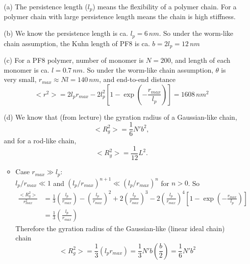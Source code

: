 \documentclass[a4paper]{article}
\begin{document}
\begin{enumerate}
    \item[(a)] The persistence length ($l_p$) means the flexibility of a polymer chain. For a polymer chain with large persistence length means the chain is high stiffness.
    
    \item[(b)] We know the persistence length is ca. $l_p=6\,nm$. So under the worm-like chain assumption, the Kuhn length of PF8  is ca. $b=2l_p=12\,nm$
    
    \item[(c)] For a PF8 polymer, number of monomer is $N=200$, and length of each monomer is ca. $l=0.7\,nm$. So under the worm-like chain assumption, $\theta$ is very small, $r_{max} \approx  Nl = 140\,nm$, and end-to-end distance 
    \[
    <r^2> = 2 l_p r_{max} - 2 l_p^2 \left[ 1- \exp \left(-\frac{r_{max}}{l_p} \right)\right] 
    = 1608\, nm^2
    \]
    \item[(d)] We know that (from lecture) the gyration radius of a Gaussian-like chain, 
    \[
    <R_g^2> = \frac{1}{6} N' b^2,
    \]
    and for a rod-like chain,  
    \[
    <R_g^2> = \frac{1}{12} L^2.
    \]
    \begin{itemize}
        \item Case $r_{max} \gg  l_p$: \\
            $l_p / r_{max} \ll  1$ and $(l_p / r_{max} )^{n+1}\ll  (l_p / r_{max} )^{n}$ for  $n >0$.
            So             \[
                \begin{aligned}
                    \frac{ <R_g^2 >}{ r_{max}^2 } 
                    &= \frac{1}{3} \left( \frac{l_p}{r_{max}} \right)
                   -            \left( \frac{l_p}{r_{max}} \right)^2
                   +2           \left( \frac{l_p}{r_{max}} \right)^3
                   -2           \left( \frac{l_p}{r_{max}} \right)^4 \left[ 1-\exp\left( - \frac{r_{max}}{l_p} \right)  \right]\\
               &= \frac{1}{3} \left( \frac{l_p}{r_{max}} \right) 
                \end{aligned}
            \]
            Therefore the gyration radius of the Gaussian-like (linear ideal chain) chain
            \[
                <R_g^2> = \frac{1}{3} ( l_p r_{max} )= \frac{1}{3} N'b \left( \frac{b}{2} \right) = \frac{1}{6} N' b^2
            \]


\end{itemize}
\end{enumerate}
\end{document}
